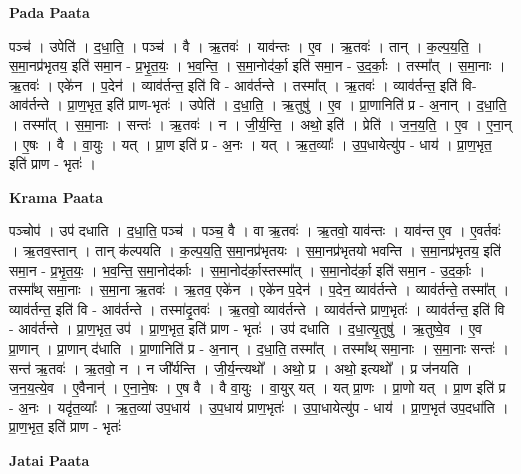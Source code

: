 \documentclass[17pt]{extarticle}
\begin{document}
\textbf{Pada Paata} \newline

पञ्च॑ । उपेति॑ । द॒धा॒ति॒ । पञ्च॑ । वै । ऋ॒तवः॑ । याव॑न्तः । ए॒व । ऋ॒तवः॑ । तान् । क॒ल्प॒य॒ति॒ । स॒मा॒नप्र॑भृतय॒ इति॑ समा॒न - प्र॒भृ॒त॒यः॒ । भ॒व॒न्ति॒ । स॒मा॒नोद॑र्का॒ इति॑ समा॒न - उ॒द॒र्काः॒ । तस्मा᳚त् । स॒मा॒नाः । ऋ॒तवः॑ । एके॑न । प॒देन॑ । व्याव॑र्तन्त॒ इति॑ वि - आव॑र्तन्ते । तस्मा᳚त् । ऋ॒तवः॑ । व्याव॑र्तन्त॒ इति॑ वि-आव॑र्तन्ते । प्रा॒ण॒भृत॒ इति॑ प्राण-भृतः॑ । उपेति॑ । द॒धा॒ति॒ । ऋ॒तुषु॑ । ए॒व । प्रा॒णानिति॑ प्र - अ॒नान् । द॒धा॒ति॒ । तस्मा᳚त् । स॒मा॒नाः । सन्तः॑ । ऋ॒तवः॑ । न । जी॒र्य॒न्ति॒ । अथो॒ इति॑ । प्रेति॑ । ज॒न॒य॒ति॒ । ए॒व । ए॒ना॒न् । ए॒षः । वै । वा॒युः । यत् । प्रा॒ण इति॑ प्र - अ॒नः । यत् । ऋ॒त॒व्याः᳚ । उ॒प॒धायेत्यु॑प - धाय॑ । प्रा॒ण॒भृत॒ इति॑ प्राण - भृतः॑ ।  \newline


\textbf{Krama Paata} \newline

पञ्चोप॑ । उप॑ दधाति । द॒धा॒ति॒ पञ्च॑ । पञ्च॒ वै । वा ऋ॒तवः॑ । ऋ॒तवो॒ याव॑न्तः । याव॑न्त ए॒व । ए॒वर्तवः॑ । ऋ॒तव॒स्तान् । तान् क॑ल्पयति । क॒ल्प॒य॒ति॒ स॒मा॒नप्र॑भृतयः । स॒मा॒नप्र॑भृतयो भवन्ति । स॒मा॒नप्र॑भृतय॒ इति॑ समा॒न - प्र॒भृ॒त॒यः॒ । भ॒व॒न्ति॒ स॒मा॒नोद॑र्काः । स॒मा॒नोद॑र्का॒स्तस्मा᳚त् । स॒मा॒नोद॑र्का॒ इति॑ समा॒न - उ॒द॒र्काः॒ । तस्मा᳚थ् समा॒नाः । स॒मा॒ना ऋ॒तवः॑ । ऋ॒तव॒ एके॑न । एके॑न प॒देन॑ । प॒देन॒ व्याव॑र्तन्ते । व्याव॑र्तन्ते॒ तस्मा᳚त् । व्याव॑र्तन्त॒ इति॑ वि - आव॑र्तन्ते । तस्मा॑दृ॒तवः॑ । ऋ॒तवो॒ व्याव॑र्तन्ते । व्याव॑र्तन्ते प्राण॒भृतः॑ । व्याव॑र्तन्त॒ इति॑ वि - आव॑र्तन्ते । प्रा॒ण॒भृत॒ उप॑ । प्रा॒ण॒भृत॒ इति॑ प्राण - भृतः॑ । उप॑ दधाति । द॒धा॒त्यृ॒तुषु॑ । ऋ॒तुष्वे॒व । ए॒व प्रा॒णान् । प्रा॒णान् द॑धाति । प्रा॒णानिति॑ प्र - अ॒नान् । द॒धा॒ति॒ तस्मा᳚त् । तस्मा᳚थ् समा॒नाः । स॒मा॒नाः सन्तः॑ । सन्त॑ ऋ॒तवः॑ । ऋ॒तवो॒ न । न जी᳚र्यन्ति । जी॒र्य॒न्त्यथो᳚ । अथो॒ प्र । अथो॒ इत्यथो᳚ । प्र ज॑नयति । ज॒न॒य॒त्ये॒व । ए॒वैनान्॑ । ए॒ना॒ने॒षः । ए॒ष वै । वै वा॒युः । वा॒युर् यत् । यत् प्रा॒णः । प्रा॒णो यत् । प्रा॒ण इति॑ प्र - अ॒नः । यदृ॑त॒व्याः᳚ । ऋ॒त॒व्या॑ उप॒धाय॑ । उ॒प॒धाय॑ प्राण॒भृतः॑ । उ॒पा॒धायेत्यु॑प - धाय॑ । प्रा॒ण॒भृत॑ उप॒दधा॑ति । प्रा॒ण॒भृत॒ इति॑ प्राण - भृतः॑ \newline

\textbf{Jatai Paata} \newline
\end{document}
